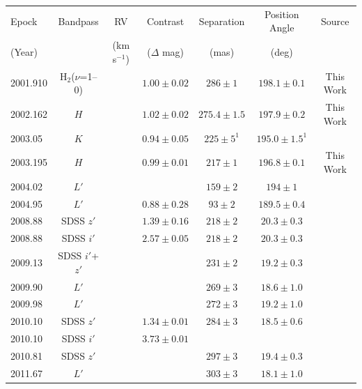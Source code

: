 \begin{landscape}
\begin{table}[hbt!]
\scriptsize
\begin{center}
\begin{tabular}{lcccccc}
\hline
Epock & Bandpass & RV & Contrast & Separation & Position Angle & Source \\
(Year) &   & (km s$^{-1}$) &  ($\Delta$ mag) & (mas) & (deg) & \\
\hline
2001.910 & H$_2$($\nu$=1--0) & & $1.00 \pm 0.02$ & $286  \pm 1$   & $198.1 \pm 0.1$   & This Work \\
2002.162 & $H$               & & $1.02 \pm 0.02$ & $275.4\pm 1.5$ & $197.9 \pm 0.2$   & This Work \\
2003.05  & $K$              &  & $0.94 \pm 0.05$ & $225  \pm 5^{1}$   & $195.0 \pm 1.5^{1}$   & \citet{Kasper07} \\
2003.195 & $H$              &  & $0.99 \pm 0.01$ & $217  \pm 1$   & $196.8 \pm 0.1$   & This Work \\
2004.02  & $L'$              & & & $159  \pm 2$   & $194   \pm 1$     & \citet{Delorme12} \\
2004.95  & $L'$              & & $0.88 \pm 0.28$ & $93   \pm 2$   & $189.5 \pm 0.4$   & \citet{Kasper07} \\
2008.88  & SDSS $z'$       &   & $1.39\pm 0.16$ & $218  \pm 2$   & $20.3  \pm 0.3$   & \citet{Bergfors10} \\
2008.88  & SDSS $i'$        &  & $2.57\pm 0.05$ & $218  \pm 2$   & $20.3  \pm 0.3$   & \citet{Bergfors10} \\
2009.13  & SDSS $i'$+$z'$    & &                & $231  \pm 2$   & $19.2  \pm 0.3$   & \citet{Janson12} \\
2009.90  &  $L'$             &   &              & $269  \pm 3$   & $18.6  \pm 1.0$   & \citet{Delorme12} \\
2009.98  &  $L'$             &    &             & $272  \pm 3$   & $19.2  \pm 1.0$   & \citet{Delorme12} \\
2010.10  & SDSS $z'$       &   & $1.34\pm 0.01$ & $284  \pm 3$   & $18.5  \pm 0.6$   & \citet{Janson12} \\
2010.10  & SDSS $i'$       &   & $3.73\pm 0.01$ &                &                   & \citet{Janson12} \\
2010.81  & SDSS $z'$       &   &                & $297  \pm 3$   & $19.4  \pm 0.3$   & \citet{Janson14a} \\
2011.67  &  $L'$             &    &             & $303  \pm 3$   & $18.1  \pm 1.0$   & \citet{Delorme12} \\

\end{tabular}
\end{center}
\end{table}
\end{landscape}
